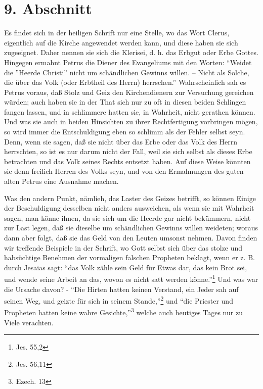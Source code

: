\section{9. Abschnitt} \label{kap12_ab9}

Es findet sich in der heiligen Schrift nur eine Stelle, wo das Wort Clerus,
eigentlich auf die Kirche angewendet werden kann, und diese haben sie sich
zugeeignet. Daher nennen sie sich die Klerisei, d. h. das Erbgut oder Erbe
Gottes. Hingegen ermahnt Petrus die Diener des Evangeliums mit den Worten:
"`Weidet die ''Heerde Christi'' nicht um schändlichen Gewinns willen. -- Nicht
als Solche, die über das Volk (oder Erbtheil des Herrn) herrschen."'
Wahrscheinlich sah es Petrus voraus, daß Stolz und Geiz den Kirchendienern zur
Versuchung gereichen würden; auch haben sie in der That sich nur zu oft in
diesen beiden Schlingen fangen lassen, und in schlimmere hatten sie, in
Wahrheit, nicht gerathen können. Und was sie auch in beiden Hinsichten zu ihrer
Rechtfertigung vorbringen mögen, so wird immer die Entschuldigung eben so
schlimm als der Fehler selbst seyn. Denn, wenn sie sagen, daß sie nicht über das
Erbe oder das Volk des Herrn herrschten, so ist es nur darum nicht der Fall,
weil sie sich selbst als dieses Erbe betrachten und das Volk seines Rechts
entsetzt haben. Auf diese Weise könnten sie denn freilich Herren des Volks seyn,
und von den Ermahnungen des guten alten Petrus eine Ausnahme machen.

\medskip

Was den andern Punkt, nämlieh, das Laster des Geizes betrifft, so können Einige
der Beschuldigung desselben nicht anders ausweichen, als wenn sie mit Wahrheit
sagen, man könne ihnen, da sie sich um die Heerde gar nicht bekümmern, nicht zur
Last legen, daß sie dieselbe um schändlichen Gewinns willen weideten; woraus
dann aber folgt, daß sie das Geld von den Leuten umsonst nehmen. Davon finden
wir treffende Beispiele in der Schrift, wo Gott selbst sich über das stolze und
habsüchtige Benehmen der vormaligen falschen Propheten beklagt, wenn er z. B.
durch Jesaias sagt: "`das Volk zähle sein Geld für Etwas dar, das kein Brot sei,
und wende seine Arbeit an das, wovon es nicht satt werden könne."'\footnote{Jes.
55,2} Und was war die Ursache davon? -  "`Die Hirten hatten keinen Verstand, ein
Jeder sah auf seinen Weg, und geizte für sich in seinem Stande,"'\footnote{Jes.
56,11} und "`die Priester und Propheten hatten keine wahre
Gesichte,"'\footnote{Ezech. 13} welche auch heutiges Tages nur zu Viele
verachten.

